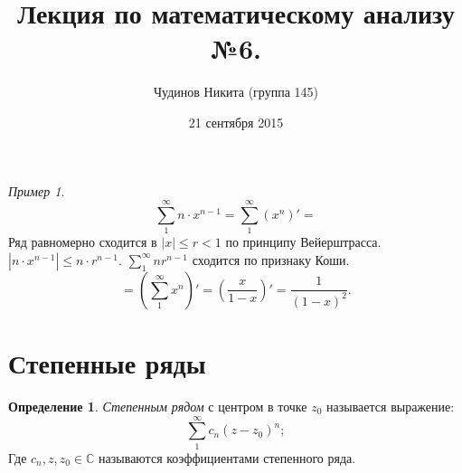 \documentclass[a4paper,12pt]{article}
\theoremstyle{remark}
\newtheorem*{example}{Пример}
\theoremstyle{definition}
\newtheorem{definition}{Определение}
\begin{document}
\sloppy
\author{Чудинов Никита (группа 145)}
\date{21 сентября 2015}
\title{\vspace{-2.0cm}Лекция по математическому анализу №6.}
\frenchspacing
 
\maketitle

\begin{example}
    \begin{equation*}
        \sum_1^\infty n \cdot x^{n-1} = \sum_1^\infty (x^n)' =
    \end{equation*}
    Ряд равномерно сходится в \(|x| \leqslant r < 1\) по принципу Вейерштрасса. \(|n \cdot x^{n-1}| \leqslant n \cdot r^{n-1}\). \(\sum_1^\infty nr^{n-1}\) сходится по признаку Коши.
    \begin{equation*}
        = \left(\sum_1^\infty x^n\right)' = \left(\frac{x}{1-x}\right)' = \frac{1}{(1-x)^2}. 
    \end{equation*} 
\end{example}

\section*{Степенные ряды}

\begin{definition}
    \emph{Степенным рядом} с центром в точке \(z_0\) называется выражение:
    \begin{equation*}
        \sum_1^\infty c_n (z-z_0)^n;
    \end{equation*}
    Где \(c_n, z, z_0 \in \mathbb{C}\) называются коэффициентами степенного ряда.
\end{definition}
\end{document}
